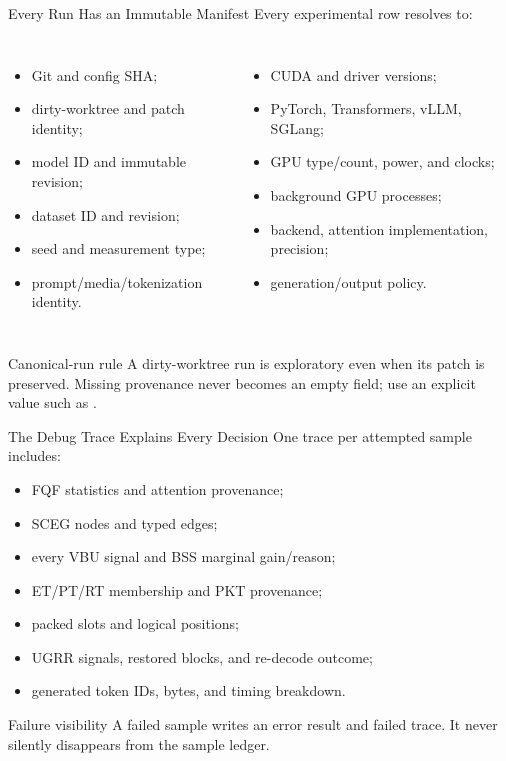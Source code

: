 \documentclass[aspectratio=169,10pt]{beamer}
\newcommand{\code}[1]{\texttt{\detokenize{#1}}}
\newcommand{\tightitems}{\setlength{\itemsep}{0.28em}\setlength{\parskip}{0pt}}
\begin{document}
\begin{frame}{Every Run Has an Immutable Manifest}
\scriptsize
Every experimental row resolves to:
\begin{columns}[T,onlytextwidth]
\begin{itemize}\tightitems
  \item Git and config SHA;
  \item dirty-worktree and patch identity;
  \item model ID and immutable revision;
  \item dataset ID and revision;
  \item seed and measurement type;
  \item prompt/media/tokenization identity.
\end{itemize}
\begin{itemize}\tightitems
  \item CUDA and driver versions;
  \item PyTorch, Transformers, vLLM, SGLang;
  \item GPU type/count, power, and clocks;
  \item background GPU processes;
  \item backend, attention implementation, precision;
  \item generation/output policy.
\end{itemize}
\end{columns}
\begin{alertblock}{Canonical-run rule}
A dirty-worktree run is exploratory even when its patch is preserved. Missing provenance never
becomes an empty field; use an explicit value such as \code{not_used}.
\end{alertblock}
\end{frame}

\begin{frame}{The Debug Trace Explains Every Decision}
\small
One trace per attempted sample includes:
\begin{itemize}\tightitems
  \item FQF statistics and attention provenance;
  \item SCEG nodes and typed edges;
  \item every VBU signal and BSS marginal gain/reason;
  \item ET/PT/RT membership and PKT provenance;
  \item packed slots and logical positions;
  \item UGRR signals, restored blocks, and re-decode outcome;
  \item generated token IDs, bytes, and timing breakdown.
\end{itemize}
\begin{alertblock}{Failure visibility}
A failed sample writes an error result and failed trace. It never silently disappears from the
sample ledger.
\end{alertblock}
\end{frame}
\end{document}
